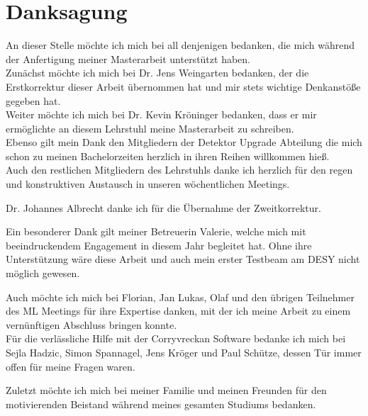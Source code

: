 \thispagestyle{empty}
\section*{Danksagung}

An dieser Stelle möchte ich mich bei all denjenigen bedanken, die mich während
der Anfertigung meiner Masterarbeit unterstützt haben. \\
Zunächst möchte ich mich bei Dr. Jens Weingarten bedanken, der die Erstkorrektur dieser Arbeit übernommen hat und mir stets wichtige Denkanstöße
gegeben hat.\\
Weiter möchte ich mich bei Dr. Kevin Kröninger bedanken, dass er mir ermöglichte an diesem Lehrstuhl meine Masterarbeit zu schreiben. \\
Ebenso gilt mein Dank den Mitgliedern der Detektor Upgrade Abteilung die mich schon zu meinen Bachelorzeiten herzlich in ihren Reihen willkommen hieß. \\
Auch den restlichen Mitgliedern des Lehrstuhls danke ich herzlich für den regen und konstruktiven Austausch in unseren wöchentlichen Meetings.

Dr. Johannes Albrecht danke ich für die Übernahme der Zweitkorrektur.

Ein besonderer Dank gilt meiner Betreuerin Valerie, welche mich mit beeindruckendem Engagement in diesem Jahr begleitet hat. Ohne ihre Unterstützung wäre
diese Arbeit und auch mein erster Testbeam am DESY nicht möglich gewesen.

Auch möchte ich mich bei Florian, Jan Lukas, Olaf und den übrigen Teilnehmer des ML Meetings für ihre Expertise danken, mit der ich meine Arbeit zu einem vernünftigen
Abschluss bringen konnte. \\
Für die verlässliche Hilfe mit der Corryvreckan Software bedanke ich mich bei Sejla Hadzic, Simon Spannagel, Jens Kröger und Paul Schütze, dessen Tür immer
offen für meine Fragen waren.

Zuletzt möchte ich mich bei meiner Familie und meinen Freunden für den motivierenden Beistand
während meines gesamten Studiums bedanken.
